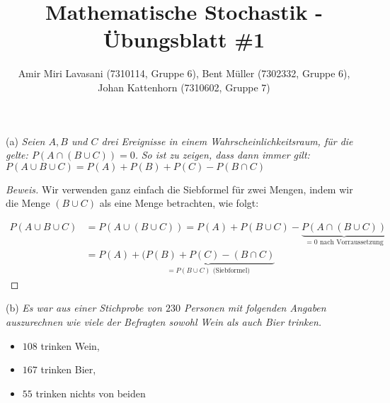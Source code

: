 \documentclass[10pt]{article}
\newenvironment{Aufgabe}[2][Aufgabe]{\begin{trivlist}
\item[\hskip \labelsep {\bfseries #1}\hskip \labelsep {\bfseries #2.}]}{\end{trivlist}}
\begin{document}
 
\title{ \textbf{Mathematische Stochastik - Übungsblatt \#1} }

\author{Amir Miri Lavasani (7310114, Gruppe 6), Bent Müller (7302332, Gruppe 6), \\ 
Johan Kattenhorn (7310602, Gruppe 7)} \maketitle

\begin{Aufgabe}{3}

\end{Aufgabe}

(a) \textit{Seien $A, B$ und $C$ drei Ereignisse in einem Wahrscheinlichkeitsraum, für die gelte: $P(A \cap (B \cup C)) = 0$.}
\textit{So ist zu zeigen, dass dann immer gilt: $P(A \cup B \cup C) = P(A) + P(B) + P(C) - P(B \cap C)$}
\begin{proof}[Beweis]
Wir verwenden ganz einfach die Siebformel für zwei Mengen, indem wir die Menge $(B \cup C)$ als eine Menge betrachten, wie folgt:

\begin{align*}
P(A \cup B \cup C) &= P(A \cup (B \cup C)) = P(A) + P(B \cup C) - \underbrace{ P(A \cap (B \cup C)) }_{\text{$= 0$ nach Vorraussetzung}} \\
&= P(A) + \underbrace{(P(B) + P(C) - (B \cap C)}_{\text{$= P(B \cup C)$ (Siebformel)}}
\end{align*}

\end{proof}

(b) \textit{Es war aus einer Stichprobe von $230$ Personen mit folgenden Angaben auszurechnen wie viele der Befragten sowohl Wein als auch Bier trinken.}
\begin{itemize}
    \item $108$ trinken Wein,

    \item $167$ trinken Bier, 

    \item $55$ trinken nichts von beiden 
\end{itemize}
\end{document}
